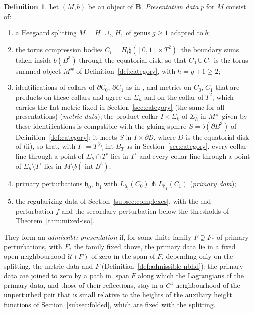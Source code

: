 \documentclass[11pt]{amsart}
\theoremstyle{definition}
\newtheorem{definition}[theorem]{Definition}
\theoremstyle{remark}
\theoremstyle{plain}
\numberwithin{equation}{section}
\newcommand{\bB}{\mathbf{B}}
\begin{document}
\begin{definition}\label{def:presentation}
Let $(M,b)$ be an object of $\bB$. \emph{Presentation data} $p$
for $M$ consist of:
\begin{enumerate}[label=(\roman*)]
\item a Heegaard splitting $M=H_0\cup_\Sigma H_1$ of genus $g\ge1$
  adapted to $b$;
\item the torus compression bodies $C_i=H_i\natural([0,1]\times T^2)$,
  the boundary sums taken inside $b(B^3)$ through the equatorial disk,
  so that $C_0\cup C_1$ is the torus-summed object $M^\#$ of
  Definition~\ref{def:category}, with $h=g+1\ge2$;
\item identifications of collars of $\partial C_0$, $\partial C_1$ as in \cite[Section~2.1]{DFL},
  and metrics on $C_0$, $C_1$ that are products on these collars and
  agree on $\Sigma_h$ and on the collar of $T^2$, which carries the flat metric fixed
  in Section~\ref{sec:category} (the same for all presentations) (\emph{metric data});
  the product collar $I\times\Sigma_h$ of $\Sigma_h$ in $M^\#$ given by these identifications
  is compatible with the gluing sphere $S=b(\partial B^3)$ of Definition~\ref{def:category}:
  it meets $S$ in $I\times\partial D$, where $D$ is the equatorial disk of (ii), so that,
  with $T^\circ=T^3\setminus\operatorname{int}B_T$ as in Section~\ref{sec:category},
  every collar line through a point of $\Sigma_h\cap T^\circ$ lies in $T^\circ$ and every
  collar line through a point of $\Sigma_h\setminus T^\circ$ lies in
  $M\setminus b(\operatorname{int}B^3)$;
\item primary perturbations $\mathfrak h_0$, $\mathfrak h_1$ with
  $L_{\mathfrak h_0}(C_0)\pitchfork L_{\mathfrak h_1}(C_1)$ (\emph{primary data});
\item the regularizing data of Section~\ref{subsec:complexes}, with the
  end perturbation $f$ and the secondary perturbation below the
  thresholds of Theorem~\ref{thm:mixed-iso}.
\end{enumerate}
They form an \emph{admissible presentation} if, for some finite family $F\supseteq F_*$ of
primary perturbations, with $F_*$ the family fixed above, the primary data lie in a fixed open
neighbourhood $\mathcal U(F)$ of zero in the span of $F$, depending only on the splitting, the
metric data and $F$ (Definition~\ref{def:admissible-nbhd}): the primary data are joined to zero
by a path in $\operatorname{span}F$ along which the Lagrangians of the primary data, and those
of their reflections, stay in a $C^1$-neighbourhood of the unperturbed pair that is small
relative to the heights of the auxiliary height functions of Section~\ref{subsec:folded},
which are fixed with the splitting.
\end{definition}
\end{document}
